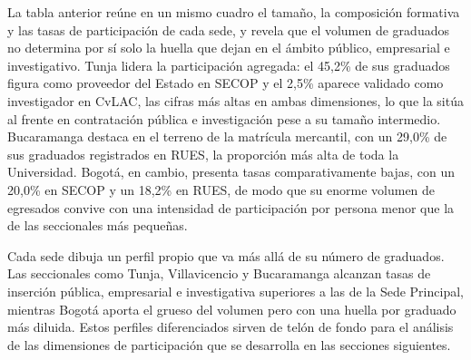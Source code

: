 

La tabla anterior reúne en un mismo cuadro el tamaño, la composición formativa y las tasas de participación de cada sede, y revela que el volumen de graduados no determina por sí solo la huella que dejan en el ámbito público, empresarial e investigativo. Tunja lidera la participación agregada: el 45,2\% de sus graduados figura como proveedor del Estado en SECOP y el 2,5\% aparece validado como investigador en CvLAC, las cifras más altas en ambas dimensiones, lo que la sitúa al frente en contratación pública e investigación pese a su tamaño intermedio. Bucaramanga destaca en el terreno de la matrícula mercantil, con un 29,0\% de sus graduados registrados en RUES, la proporción más alta de toda la Universidad. Bogotá, en cambio, presenta tasas comparativamente bajas, con un 20,0\% en SECOP y un 18,2\% en RUES, de modo que su enorme volumen de egresados convive con una intensidad de participación por persona menor que la de las seccionales más pequeñas.

\begin{cajahallazgo}
Cada sede dibuja un perfil propio que va más allá de su número de graduados. Las seccionales como Tunja, Villavicencio y Bucaramanga alcanzan tasas de inserción pública, empresarial e investigativa superiores a las de la Sede Principal, mientras Bogotá aporta el grueso del volumen pero con una huella por graduado más diluida. Estos perfiles diferenciados sirven de telón de fondo para el análisis de las dimensiones de participación que se desarrolla en las secciones siguientes.
\end{cajahallazgo}

